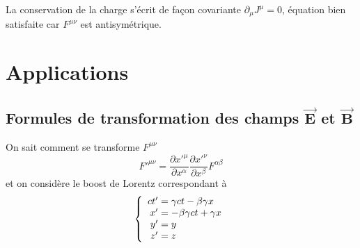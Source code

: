 \begin{remark}
	La conservation de la charge s'écrit de façon covariante $\partial_\mu J^\mu=0$, équation bien satisfaite car $F^{\mu\nu}$ est antisymétrique.
\end{remark}

\section{Applications}
\subsection[\texorpdfstring{Formules de transformation des champs $\vec{E}$ et $\vec{B}$}{Formules de transformation des champs E et B}]{Formules de transformation des champs $\boldsymbol{\vec{E}}$ et $\boldsymbol{\vec{B}}$}
On sait comment se transforme $F^{\mu\nu}$
$$
	F'^{\mu\nu}=\frac{\partial x'^\mu}{\partial x^\alpha}\frac{\partial x'^\nu}{\partial x^\beta}F^{\alpha\beta}
$$
et on considère le boost de Lorentz correspondant à
{\renewcommand*{\arraystretch}{1.2}$$
	\left\{ \begin{array}{r@{\;}l}
		ct'&=\gamma ct-\beta\gamma x\\
		x'&=-\beta\gamma ct+\gamma x\\
		y'&=y\\
		z'&=z
	\end{array} \right.
$$}

